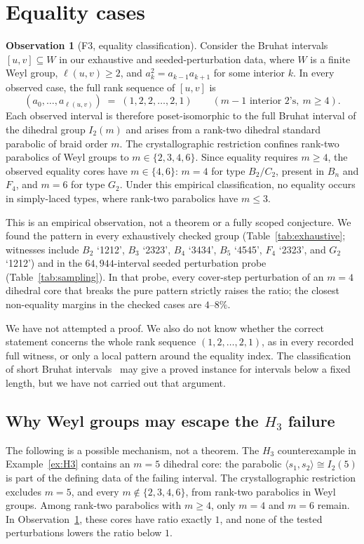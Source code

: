 \documentclass[11pt]{amsart}
\theoremstyle{plain}
\theoremstyle{definition}
\newtheorem{observation}[theorem]{Observation}
\theoremstyle{remark}
\newcommand{\W}{W}
\begin{document}
\section{Equality cases}
\label{sec:F3}

\begin{observation}[F3, equality classification]
\label{obs:F3}
Consider the Bruhat intervals $[u,v]\subseteq\W$ in our exhaustive and
seeded-perturbation data, where $\W$ is a finite Weyl group,
$\ell(u,v)\ge2$, and $a_k^2=a_{k-1}a_{k+1}$ for some interior $k$. In
every observed case, the full rank sequence of $[u,v]$ is
\[
(a_0,\dots,a_{\ell(u,v)}) \;=\; (1,2,2,\dots,2,1) \qquad (m-1 \text{ interior
2's}, \ m\ge4).
\]
Each observed interval is therefore poset-isomorphic to the full Bruhat
interval of the dihedral group $I_2(m)$ and arises from a rank-two
dihedral standard parabolic of braid order $m$. The crystallographic
restriction confines rank-two parabolics of Weyl groups to
$m\in\{2,3,4,6\}$. Since equality requires $m\ge4$, the observed equality
cores have $m\in\{4,6\}$: $m=4$ for type $B_2/C_2$, present in $B_n$ and
$F_4$, and $m=6$ for type $G_2$. Under this empirical classification, no
equality occurs in simply-laced types, where rank-two parabolics have
$m\le3$.
\end{observation}

This is an empirical observation, not a theorem or a fully scoped
conjecture. We found the pattern in every exhaustively checked group
(Table~\ref{tab:exhaustive}; witnesses include $B_2$ `1212', $B_3$
`2323', $B_4$ `3434', $B_5$ `4545', $F_4$ `2323', and $G_2$ `1212') and
in the $64{,}944$-interval seeded perturbation probe
(Table~\ref{tab:sampling}). In that probe, every cover-step perturbation of an $m=4$ dihedral core that breaks the pure pattern strictly raises the ratio; the closest non-equality margins in the checked cases are
$4$--$8\%$.

We have not attempted a proof. We also do not know whether the correct
statement concerns the whole rank sequence $(1,2,\dots,2,1)$, as in every
recorded full witness, or only a local pattern around the equality index.
The classification of short Bruhat intervals~\cite{short-intervals} may
give a proved instance for intervals below a fixed length, but we have not
carried out that argument.

\subsection*{Why Weyl groups may escape the $H_3$ failure}
The following is a possible mechanism, not a theorem. The $H_3$
counterexample in Example~\ref{ex:H3} contains an $m=5$ dihedral core: the
parabolic $\langle s_1,s_2\rangle\cong I_2(5)$ is part of the defining
data of the failing interval. The crystallographic restriction excludes
$m=5$, and every $m\notin\{2,3,4,6\}$, from rank-two parabolics in Weyl
groups. Among rank-two parabolics with $m\ge4$, only $m=4$ and $m=6$
remain. In Observation~\ref{obs:F3}, these cores have ratio exactly $1$,
and none of the tested perturbations lowers the ratio below $1$.
\end{document}

